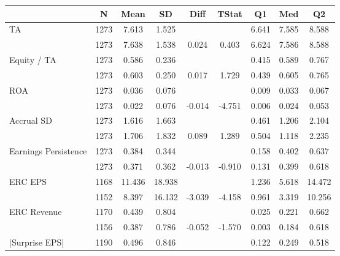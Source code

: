 \begin{tabular}{l*{8}{c}}
\toprule
            &           N&        Mean&          SD&        Diff&       TStat&          Q1&         Med&          Q2\\
\midrule
TA          &        1273&       7.613&       1.525&           &           &       6.641&       7.585&       8.588\\
          &        1273&       7.638&       1.538&       0.024&       0.403&       6.624&       7.586&       8.588\\
Equity / TA         &        1273&       0.586&       0.236&           &           &       0.415&       0.589&       0.767\\
         &        1273&       0.603&       0.250&       0.017&       1.729&       0.439&       0.605&       0.765\\
ROA         &        1273&       0.036&       0.076&           &           &       0.009&       0.033&       0.067\\
         &        1273&       0.022&       0.076&      -0.014&      -4.751&       0.006&       0.024&       0.053\\
Accrual SD    &        1273&       1.616&       1.663&           &           &       0.461&       1.206&       2.104\\
    &        1273&       1.706&       1.832&       0.089&       1.289&       0.504&       1.118&       2.235\\
Earnings Persistence        &        1273&       0.384&       0.344&           &           &       0.158&       0.402&       0.637\\
    &        1273&       0.371&       0.362&      -0.013&      -0.910&       0.131&       0.399&       0.618\\
ERC EPS      &        1168&      11.436&      18.938&           &           &       1.236&       5.618&      14.472\\
     &        1152&       8.397&      16.132&      -3.039&      -4.158&       0.961&       3.319&      10.256\\
ERC Revenue       &        1170&       0.439&       0.804&           &           &       0.025&       0.221&       0.662\\
      &        1156&       0.387&       0.786&      -0.052&      -1.570&       0.003&       0.184&       0.618\\
|Surprise EPS|&        1190&       0.496&       0.846&           &           &       0.122&       0.249&       0.518\\

\end{tabular}
